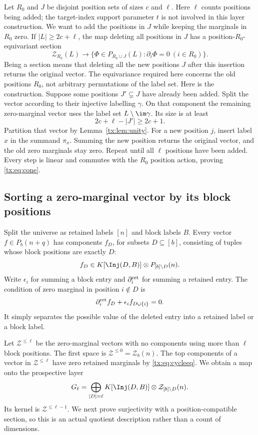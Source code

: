 Let $R_0$ and $J$ be disjoint position sets of sizes $c$ and $\ell$. Here $\ell$ counts positions being added; the target-index support parameter $t$ is not involved in this layer construction. We want to add the positions in $J$ while keeping the marginals in $R_0$ zero. If $|L|\ge2c+\ell$, the map deleting all positions in $J$ has a position-$R_0$-equivariant section
\begin{equation}\label{tx:eq:cone}
\mathcal Z_{R_0}(L)\longrightarrow
\{\Phi\in P_{R_0\cup J}(L):\partial_i\Phi=0\ (i\in R_0)\}.
\end{equation}
Being a section means that deleting all the new positions $J$
after this insertion returns the original vector. The equivariance
required here concerns the old positions $R_0$, not arbitrary
permutations of the label set.
Here is the construction. Suppose some positions $J'\subsetneq J$ have already been added. Split the vector according to their injective labelling $\gamma$. On that component the remaining zero-marginal vector uses the label set $L\setminus\im\gamma$. Its size is at least
\[2c+\ell-|J'|\ge2c+1.
\]
Partition that vector by Lemma~\ref{tx:lem:unity}. For a new position $j$, insert label $x$ in the summand $\pi_x$. Summing the new position returns the original vector, and the old zero marginals stay zero. Repeat until all $\ell$ positions have been added. Every step is linear and commutes with the $R_0$ position action, proving \eqref{tx:eq:cone}.

\subsection{Sorting a zero-marginal vector by its block positions}
Split the universe as retained labels $[n]$ and block labels $B$. Every vector $f\in P_b(n+q)$ has components $f_D$, for subsets $D\subseteq[b]$, consisting of tuples whose block positions are exactly $D$:
\[f_D\in K[\Inj(D,B)]\otimes P_{[b]\setminus D}(n).
\]
Write $\epsilon_i$ for summing a block entry and $\partial_i^{\rm ret}$ for summing a retained entry. The condition of zero marginal in position $i\notin D$ is
\begin{equation}\label{tx:eq:cycleeq}
\partial_i^{\rm ret}f_D+\epsilon_i f_{D\cup\{i\}}=0.
\end{equation}
It simply separates the possible value of the deleted entry into a retained label or a block label.

Let $\mathcal Z^{\le \ell}$ be the zero-marginal vectors with no components using more than $\ell$ block positions. The first space is $\mathcal Z^{\le0}=\mathcal Z_b(n)$. The top components of a vector in $\mathcal Z^{\le \ell}$ have zero retained marginals by \eqref{tx:eq:cycleeq}. We obtain a map onto the prospective layer
\[G_\ell=\bigoplus_{|D|=\ell}K[\Inj(D,B)]\otimes \mathcal Z_{[b]\setminus D}(n).
\]
Its kernel is $\mathcal Z^{\le \ell-1}$. We next prove surjectivity with a position-compatible section, so this is an actual quotient description rather than a count of dimensions.


